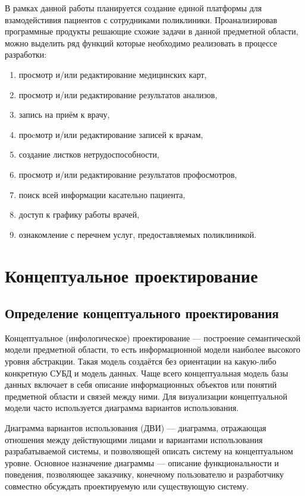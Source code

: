\documentclass[14pt,a4paper,russian]{extreport}
\begin{document}
В рамках данной работы планируется создание единой платформы для
взамодейстивия пациентов с сотрудниками поликлиники. Проанализировав программные продукты решающие
схожие задачи в данной предметной области, можно выделить ряд функций которые необходимо
реализовать в процессе разработки:
\begin{enumerate}
            \item просмотр и/или редактирование медицинских карт,
            \item просмотр и/или редактирование результатов анализов,
            \item запись на приём к врачу,
            \item проcмотр и/или редактирование записей к врачам,
            \item создание листков нетрудоспособности,
            \item просмотр и/или редактирование результатов профосмотров,
            \item поиск всей информации касательно пациента,
            \item доступ к графику работы врачей,
            \item ознакомление с перечнем услуг, предоставляемых поликлиникой.
\end{enumerate}


\chapter{Концептуальное проектирование}
\section{Определение концептуального проектирования}
Концептуальное (инфологическое) проектирование — построение семантической модели предметной
области, то есть информационной модели наиболее высокого уровня абстракции. Такая модель создаётся
без ориентации на какую-либо конкретную СУБД и модель данных.
Чаще всего концептуальная модель базы данных включает в себя описание информационных объектов 
или понятий предметной области и связей между ними. Для визуализации концептуальной
модели часто используется диаграмма вариантов использования.\par
Диаграмма вариантов использования (ДВИ) — диаграмма, отражающая
отношения между действующими лицами и вариантами использования разрабатываемой системы, и
позволяющей описать систему на концептуальном уровне.
Основное назначение диаграммы — описание функциональности и поведения, позволяющее заказчику,
конечному пользователю и разработчику совместно обсуждать проектируемую или существующую
систему.\par
\end{document}
